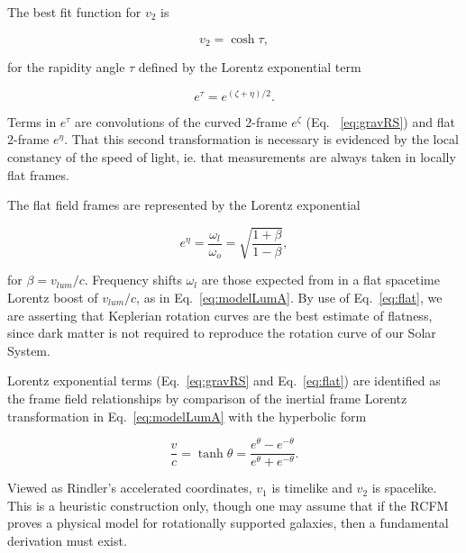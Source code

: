 \documentclass[reprint,%
 amsmath,amssymb,
 aps,
]{revtex4-1}
\begin{document}
The best fit function  for  $v_2$ is 

\begin{equation}
v_{2} =  \cosh \tau, 
\label{eq:hyperbolico}
\end{equation}

 for the rapidity angle $\tau$ defined by the    Lorentz exponential  term  
  
 
\begin{equation}
    e^{\tau}=   e^{(\zeta+\eta)/2}.
\end{equation}
 
Terms in $e^{\tau}$ are  convolutions of the curved 2-frame $e^\zeta$ (Eq.~ \ref{eq:gravRS})  and flat 2-frame $e^\eta$.  That this second transformation  is necessary is evidenced by the local constancy of the speed of light, ie. that measurements are always taken in locally flat frames. 

  The flat field frames  are represented by the
Lorentz exponential  

\begin{equation}
    e^{\eta}=\frac{\omega_{l}}{\omega_o}= \sqrt{\frac{1+\beta}{1-\beta}},
    \label{eq:flat}
\end{equation}  
     
for $\beta = v_{lum}/c$. 
Frequency shifts $\omega_{l}$ are those expected from 
in a flat spacetime Lorentz boost of $v_{lum}/c$, 
as in Eq.~\ref{eq:modelLumA}.  
By use of Eq.~\ref{eq:flat}, we   are asserting  that Keplerian rotation curves are     the best estimate of flatness, since dark matter is not required to  reproduce the rotation curve of our Solar System.
 
  Lorentz exponential terms (Eq.~\ref{eq:gravRS} and Eq.~\ref{eq:flat})
  are    identified  as the  frame field relationships   by  comparison of 
     the inertial frame Lorentz transformation in  Eq.~\ref{eq:modelLumA} with 
the  hyperbolic form \cite{rindler2013essential} 


     \begin{equation}
         \frac{v}{c} = \tanh \theta = \frac{e^\theta - e^{-\theta}}{e^\theta + e^{-\theta}} .   
         \label{boost}
     \end{equation} 

 
 
  
  Viewed as    Rindler's accelerated coordinates\cite{MTW,Wald, rindler2013essential}, 
     $v_1$   is  timelike   and $v_2$ is spacelike. This is a heuristic construction only, though one may assume that if the RCFM proves a physical model for rotationally supported galaxies, then a fundamental derivation must exist. 
\end{document}
